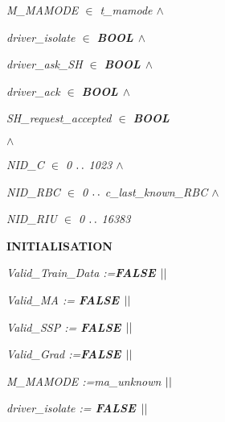 \documentclass[11pt]{article}
\begin{document}
\begin{sloppypar}
\hspace*{0.20in}\hspace*{0.20in}\it M\_MAMODE  $\in$  \it t\_mamode  $\land$ 

\hspace*{0.20in}\hspace*{0.20in}\it driver\_isolate  $\in$  \bf BOOL  $\land$ 

\hspace*{0.20in}\it driver\_ask\_SH  $\in$  \bf BOOL  $\land$ 

\hspace*{0.20in}\it driver\_ack  $\in$  \bf BOOL  $\land$ 

\hspace*{0.20in}\hspace*{0.20in}\it SH\_request\_accepted  $\in$  \bf BOOL

\hspace*{0.20in} $\land$ 

\hspace*{0.20in}\it NID\_C  $\in$  \rm 0 $\mathbin{\ldotp\ldotp}$ \rm 1\rm 0\rm 2\rm 3  $\land$ 

\hspace*{0.20in}\it NID\_RBC  $\in$  \rm 0 $\mathbin{\ldotp\ldotp}$ \it c\_last\_known\_RBC  $\land$ 

\hspace*{0.20in}\it NID\_RIU  $\in$  \rm 0 $\mathbin{\ldotp\ldotp}$ \rm 1\rm 6\rm 3\rm 8\rm 3 

\vspace*{4mm}
\bf INITIALISATION

\hspace*{0.20in}\it Valid\_Train\_Data \rm :=\hspace*{0.10in}\bf FALSE  $\mbox{$\mid\mid$}$ 

\hspace*{0.20in}\it Valid\_MA \rm := \bf FALSE  $\mbox{$\mid\mid$}$ 

\hspace*{0.20in}\it Valid\_SSP \rm := \bf FALSE  $\mbox{$\mid\mid$}$ 

\hspace*{0.20in}\it Valid\_Grad \rm :=\hspace*{0.10in}\bf FALSE  $\mbox{$\mid\mid$}$ 

\hspace*{0.20in}\it M\_MAMODE \rm :=\hspace*{0.10in}\it ma\_unknown  $\mbox{$\mid\mid$}$ 

\hspace*{0.20in}\it driver\_isolate \rm := \bf FALSE  $\mbox{$\mid\mid$}$ 


\end{sloppypar}
\end{document}
